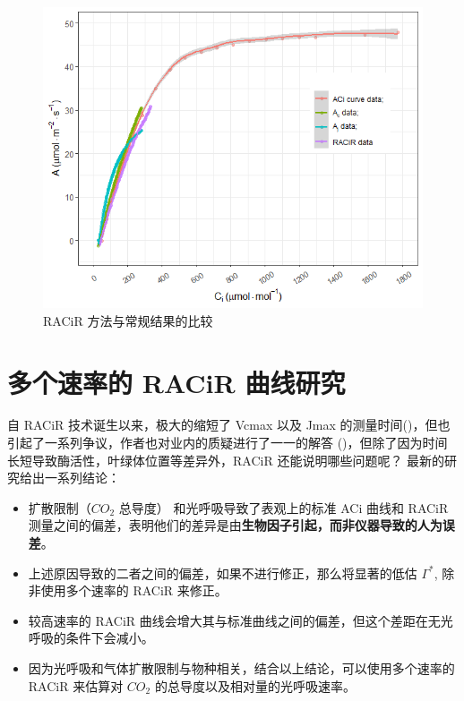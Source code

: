 \documentclass[
]{krantz}
\begin{document}
\begin{figure}
\includegraphics[width=1\linewidth]{images/racir} \caption{RACiR 方法与常规结果的比较}\label{fig:racir}
\end{figure}

\cleardoublepage

\hypertarget{multi1}{%
\section{多个速率的 RACiR 曲线研究}\label{multi1}}

自 RACiR 技术诞生以来，极大的缩短了 Vcmax 以及 Jmax 的测量时间(\citet{stinziano2017})，但也引起了一系列争议，作者也对业内的质疑进行了一一的解答 (\citet{stinziano2018})，但除了因为时间长短导致酶活性，叶绿体位置等差异外，RACiR 还能说明哪些问题呢？\citet{stinziano2019} 最新的研究给出一系列结论：

\begin{itemize}
\item
  扩散限制（\(CO_2\) 总导度） 和光呼吸导致了表观上的标准 ACi 曲线和 RACiR 测量之间的偏差，表明他们的差异是由\textbf{生物因子引起，而非仪器导致的人为误差}。
\item
  上述原因导致的二者之间的偏差，如果不进行修正，那么将显著的低估 \(\Gamma^*\), 除非使用多个速率的 RACiR 来修正。
\item
  较高速率的 RACiR 曲线会增大其与标准曲线之间的偏差，但这个差距在无光呼吸的条件下会减小。
\item
  因为光呼吸和气体扩散限制与物种相关，结合以上结论，可以使用多个速率的 RACiR 来估算对 \(CO_2\) 的总导度以及相对量的光呼吸速率。
\end{itemize}
\end{document}
